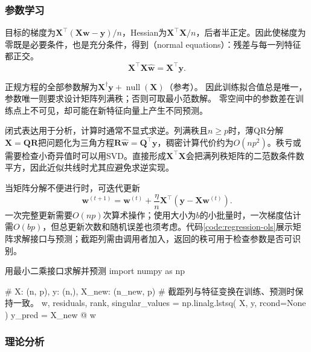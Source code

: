 \subsubsection{参数学习}
\label{sec:regression-ols-learning}

目标的梯度为$\bm{X}^{\top}(\bm{X}\bm{w}-\bm{y})/n$，Hessian为$\bm{X}^{\top}\bm{X}/n$，后者半正定。因此使梯度为零既是必要条件，也是充分条件，得到（normal equations）：残差与每一列特征都正交。
\begin{equation}
  \bm{X}^{\top}\bm{X}\widehat{\bm{w}}=\bm{X}^{\top}\bm{y}.
  \label{eq:regression-normal-equations}
\end{equation}

正规方程的全部参数解为$\bm X^\dagger\bm y+\operatorname{null}(\bm X)$（参考）。
因此训练拟合值总是唯一，参数唯一则要求设计矩阵列满秩；否则可取最小范数解。
零空间中的参数差在训练点上不可见，却可能在新特征向量上产生不同预测。

闭式表达用于分析，计算时通常不显式求逆。列满秩且$n\geq p$时，薄QR分解$\bm{X}=\bm{Q}\bm{R}$把问题化为三角方程$\bm{R}\widehat{\bm{w}}=\bm{Q}^{\top}\bm{y}$，稠密计算代价约为$O(np^2)$。秩亏或需要检查小奇异值时可以用SVD。直接形成$\bm{X}^{\top}\bm{X}$会把满列秩矩阵的二范数条件数平方，因此近似共线时尤其应避免求逆实现。

当矩阵分解不便进行时，可迭代更新
\begin{equation}
  \bm{w}^{(t+1)}
  =\bm{w}^{(t)}+\frac{\eta}{n}
       \bm{X}^{\top}(\bm{y}-\bm{X}\bm{w}^{(t)}).
  \label{eq:regression-ols-gradient}
\end{equation}
一次完整更新需要$O(np)$次算术操作；使用大小为$b$的小批量时，一次梯度估计需$O(bp)$，但总更新次数和随机误差也须考虑。代码\ref{code:regression-ols}展示矩阵求解接口与预测；截距列需由调用者加入，返回的秩可用于检查参数是否可识别。

\begin{codeblock}[language=Python,label={code:regression-ols},unbreakable]{用最小二乘接口求解并预测}
import numpy as np

# X: (n, p), y: (n,), X_new: (n_new, p)
# 截距列与特征变换在训练、预测时保持一致。
w, residuals, rank, singular_values = np.linalg.lstsq(
    X, y, rcond=None
)
y_pred = X_new @ w
\end{codeblock}

\subsubsection{理论分析}
\label{sec:regression-ols-theory}

